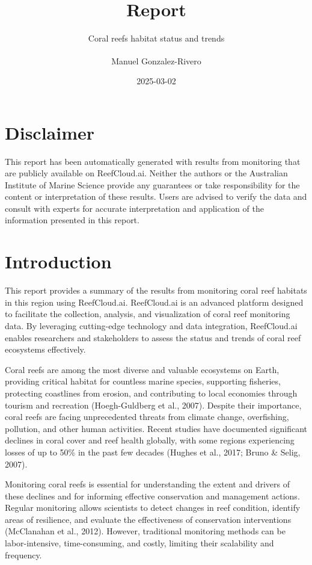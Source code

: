 \documentclass[
  letterpaper,
  DIV=11,
  numbers=noendperiod]{scrartcl}
\title{Report}
\subtitle{Coral reefs habitat status and trends}
\author{Manuel Gonzalez-Rivero\textsuperscript{}}
\date{2025-03-02}
\makeatletter
\renewcommand{\maketitle}{\bgroup\setlength{\parindent}{0pt}
\begin{flushleft}
  {\sffamily\huge\textbf{\MakeUppercase{\@title}}} \vspace{0.3cm} \newline
  {\Large {\@subtitle}} \newline
  {\@author} \newline
  \@date
\end{flushleft}\egroup
}
\makeatother
\begin{document}
\maketitle

\pagestyle{mystyle}


\section{Disclaimer}\label{disclaimer}

This report has been automatically generated with results from
monitoring that are publicly available on ReefCloud.ai. Neither the
authors or the Australian Institute of Marine Science provide any
guarantees or take responsibility for the content or interpretation of
these results. Users are advised to verify the data and consult with
experts for accurate interpretation and application of the information
presented in this report.

\newpage

\section{Introduction}\label{introduction}

This report provides a summary of the results from monitoring coral reef
habitats in this region using ReefCloud.ai. ReefCloud.ai is an advanced
platform designed to facilitate the collection, analysis, and
visualization of coral reef monitoring data. By leveraging cutting-edge
technology and data integration, ReefCloud.ai enables researchers and
stakeholders to assess the status and trends of coral reef ecosystems
effectively.

Coral reefs are among the most diverse and valuable ecosystems on Earth,
providing critical habitat for countless marine species, supporting
fisheries, protecting coastlines from erosion, and contributing to local
economies through tourism and recreation (Hoegh-Guldberg et al., 2007).
Despite their importance, coral reefs are facing unprecedented threats
from climate change, overfishing, pollution, and other human activities.
Recent studies have documented significant declines in coral cover and
reef health globally, with some regions experiencing losses of up to
50\% in the past few decades (Hughes et al., 2017; Bruno \& Selig,
2007).

Monitoring coral reefs is essential for understanding the extent and
drivers of these declines and for informing effective conservation and
management actions. Regular monitoring allows scientists to detect
changes in reef condition, identify areas of resilience, and evaluate
the effectiveness of conservation interventions (McClanahan et al.,
2012). However, traditional monitoring methods can be labor-intensive,
time-consuming, and costly, limiting their scalability and frequency.
\end{document}
